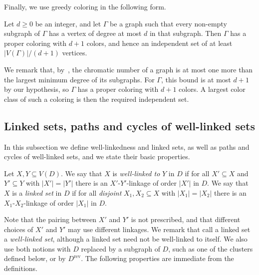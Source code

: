 \documentclass[fontsize=12pt,leading=14pt]{fullpaper}
\newcommand{\rev}{\mathrm{rev}}
\begin{document}
Finally, we use greedy coloring in the following form.

\begin{proposition}\label{obs:greedy}
  Let $d\ge0$ be an integer, and let $\Gamma$ be a graph such that every non-empty subgraph of $\Gamma$ has a vertex of degree at most $d$ in that subgraph.
  Then $\Gamma$ has a proper coloring with $d+1$ colors, and hence an independent set of at least $|V(\Gamma)|/(d+1)$ vertices.
\end{proposition}

We remark that, by~\cite[Proposition~5.2.2]{Diestel17}, the chromatic number of a graph is at most one more than the largest minimum degree of its subgraphs.
For $\Gamma$, this bound is at most $d+1$ by our hypothesis, so $\Gamma$ has a proper coloring with $d+1$ colors.
A largest color class of such a coloring is then the required independent set.

\subsection{Linked sets, paths and cycles of well-linked sets}\label{sec:prelim-wl}

In this subsection we define well-linkedness and linked sets, as well as paths and cycles of well-linked sets, and we state their basic properties.

\begin{definition}\label{def:linked}
  Let $X,Y\subseteq V(D)$.
  We say that $X$ is \emph{well-linked to} $Y$ in $D$ if for all $X'\subseteq X$ and $Y'\subseteq Y$ with $|X'|=|Y'|$ there is an $X'$-$Y'$-linkage of order $|X'|$ in $D$.
  We say that $X$ is a \emph{linked set} in $D$ if for all \textsl{disjoint} $X_1,X_2\subseteq X$ with $|X_1|=|X_2|$ there is an $X_1$-$X_2$-linkage of order $|X_1|$ in $D$.
\end{definition}

Note that the pairing between $X'$ and $Y'$ is not prescribed, and that different choices of $X'$ and $Y'$ may use different linkages.
We remark that \textcite{CLMS22} call a linked set a \emph{well-linked set}, although a linked set need not be well-linked to itself.
We also use both notions with $D$ replaced by a subgraph of $D$, such as one of the clusters defined below, or by $D^\rev$.
The following properties are immediate from the definitions.
\end{document}

